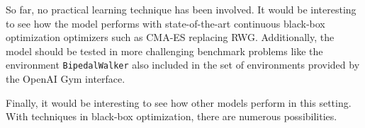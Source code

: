 So far, no practical learning technique has been involved. It would be interesting to see how the model performs with state-of-the-art continuous black-box optimization optimizers such as CMA-ES replacing RWG. Additionally, the model should be tested in more challenging benchmark problems like the environment \verb|BipedalWalker| also included in the set of environments provided by the OpenAI Gym interface.

Finally, it would be interesting to see how other models perform in this setting. With techniques in black-box optimization, there are numerous possibilities.
